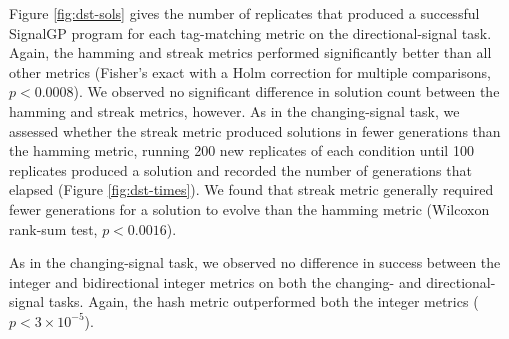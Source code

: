 Figure \ref{fig:dst-sols} gives the number of replicates that produced a successful SignalGP program for each tag-matching metric on the directional-signal task.
Again, the hamming and streak metrics performed significantly better than all other metrics (Fisher's exact with a Holm correction for multiple comparisons, $p < 0.0008$). We observed no significant difference in solution count between the hamming and streak metrics, however.
As in the changing-signal task, we assessed whether the streak metric produced solutions in fewer generations than the hamming metric, running 200 new replicates of each condition until 100 replicates produced a solution and recorded the number of generations that elapsed (Figure \ref{fig:dst-times}).
We found that streak metric generally required fewer generations for a solution to evolve than the hamming metric (Wilcoxon rank-sum test, $p < 0.0016$).

As in the changing-signal task, we observed no difference in success between the integer and bidirectional integer metrics on both the changing- and directional-signal tasks.
Again, the hash metric outperformed both the integer metrics ($p < 3\times10^{-5}$).




